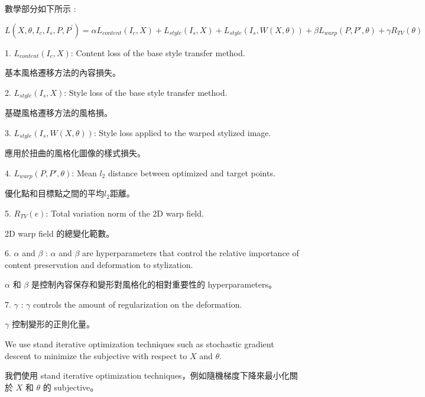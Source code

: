 \documentclass[10pt,UTF8]{ctexart}
\begin{document}
數學部分如下所示 :

$$L\left(X,\theta,I_c,I_s,P,P^\prime\right)=\alpha L_{content}\left(I_c,X\right)+L_{style}(I_s,X)+L_{style}(I_s,W(X,\theta))+\beta L_{warp}(P,P\prime,\theta)+\gamma R_{TV}(\theta)$$

1. $L_{content} (I_{c},X)$: Content loss of the base style transfer method.

基本風格遷移方法的內容損失。

2. $L_{style} (I_{s}, X)$: Style loss of the base style transfer method.

基礎風格遷移方法的風格損。

3. $L_{style} (I_{s}, W(X,\theta))$: Style loss applied to the warped stylized image.

應用於扭曲的風格化圖像的樣式損失。

4. $L_{warp}(P, P', \theta)$: Mean $l_{2}$ distance between optimized and target points.

優化點和目標點之間的平均$l_{2}$距離。

5. $R_{TV}(e)$: Total variation norm of the 2D warp field.

2D warp field 的總變化範數。

6. $ \alpha $ and $ \beta $ : $ \alpha $ and $ \beta $ are hyperparameters that control the relative importance of content preservation and deformation to stylization.

$ \alpha $ 和 $ \beta $ 是控制內容保存和變形對風格化的相對重要性的 hyperparameters。

7. $ \gamma $ : $ \gamma $ controls the amount of regularization on the deformation.

$ \gamma $ 控制變形的正則化量。

We use stand iterative optimization techniques such as stochastic gradient descent to minimize the subjective with respect to $X$ and $\theta$.

我們使用 stand iterative optimization techniques，例如隨機梯度下降來最小化關於 $X$ 和 $\theta$ 的 subjective。









\clearpage
\end{document}
